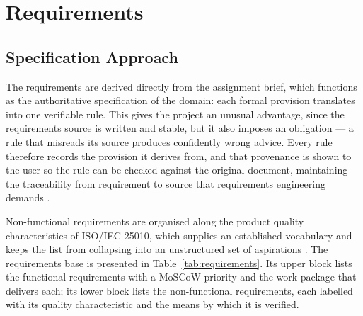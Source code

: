\documentclass[a4paper,11pt]{article}
\begin{document}
\section{Requirements}\label{sec:requirements}

\subsection{Specification Approach}\label{subsec:approach}

The requirements are derived directly from the assignment brief, which functions
as the authoritative specification of the domain: each formal provision
translates into one verifiable rule. This gives the project an unusual
advantage, since the requirements source is written and stable, but it also
imposes an obligation --- a rule that misreads its source produces confidently
wrong advice. Every rule therefore records the provision it derives from, and
that provenance is shown to the user so the rule can be checked against the
original document, maintaining the traceability from requirement to source that
requirements engineering demands \citep{Sommerville2020}.

Non-functional requirements are organised along the product quality
characteristics of ISO/IEC 25010, which supplies an established vocabulary and
keeps the list from collapsing into an unstructured set of aspirations
\citep{ISO25010}. The requirements base is presented in
Table~\ref{tab:requirements}. Its upper block lists the functional requirements
with a MoSCoW priority and the work package that delivers each; its lower block
lists the non-functional requirements, each labelled with its quality
characteristic and the means by which it is verified.
\end{document}
